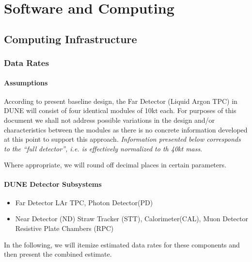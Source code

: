 \chapter{Software and Computing}
\label{ch:detectors-sc}

\section{Computing Infrastructure}
\label{sec:detectors-sc-infrastructure}

\subsection{Data Rates}
\label{sec:detectors-sc-infrastructure-data-rates}

\subsubsection{Assumptions}
According to present baseline design, the Far Detector (Liquid Argon TPC) in DUNE will consist of four identical modules of 10kt each.
For purposes of this document we shall not address possible variations in the design and/or characteristics between
the modules as there is no concrete information developed at this point to support this approach.
\textit{Information presented below corresponds to the ``full detector'', i.e. is effectively normalized to th 40kt mass}.

Where appropriate, we will round off decimal places in certain parameters.

\subsubsection{DUNE Detector Subsystems}
\begin{itemize}
\item Far Detector LAr TPC, Photon Detector(PD)
\item Near Detector (ND) Straw Tracker (STT), Calorimeter(CAL), Muon Detector Resistive Plate Chambers (RPC)
\end{itemize}

In the following, we will itemize estimated data rates for these components and then present the combined estimate.

